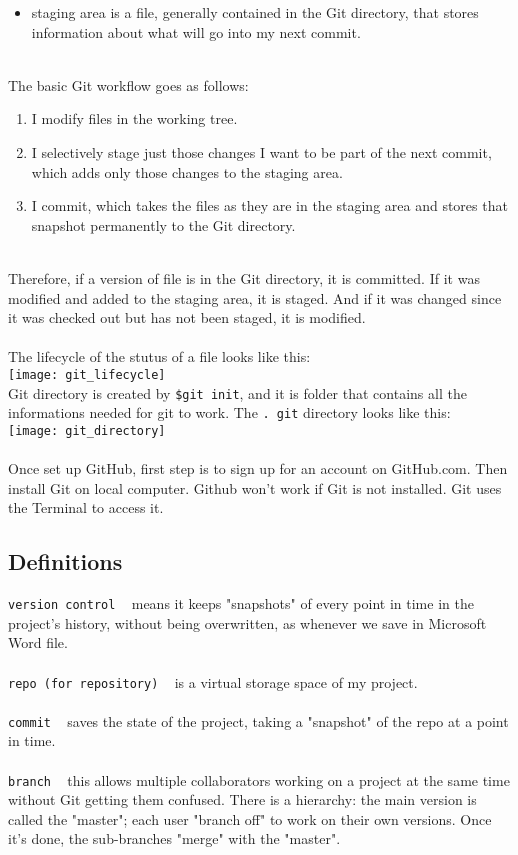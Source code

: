 \documentclass{article}
\begin{document}
{{{\begin{itemize}
  \item staging area is a file, generally contained in the Git directory, that stores information about what will go into my next commit. 
\end{itemize}
\\
The basic Git workflow goes as follows:
\begin{enumerate}
  \item I modify files in the working tree.
  \item I selectively stage just those changes I want to be part of the next commit, which adds only those changes to the staging area.
  \item I commit, which takes the files as they are in the staging area and stores that snapshot permanently to the Git directory. 
\end{enumerate}
\\
Therefore, if a version of file is in the Git directory, it is committed. If it was modified and added to the staging area, it is staged. And if it was changed since it was checked out but has not been staged, it is modified. \\
\\
The lifecycle of the stutus of a file looks like this:\\
\texttt{[image: git\_lifecycle]}\\
Git directory is created by \texttt{\$git init}, and it is folder that contains all the informations needed for git to work. The \texttt{. git} directory looks like this:\\
\texttt{[image: git\_directory]}\\
\\
Once
\To set up GitHub, first step is to sign up for an account on GitHub.com. Then install Git on local computer. Github won't work if Git is not installed. Git uses the Terminal to access it. \\ 
\subsection{Definitions}
\texttt{version control} ~ means it keeps "snapshots" of every point in time in the project's history, without being overwritten, as whenever we save in Microsoft Word file.\\
\\
\texttt{repo (for repository)} ~ is a virtual storage space of my project. \\
\\
\texttt{commit} ~  saves the state of the project, taking a "snapshot" of the repo at a point in time.\\
\\
\texttt{branch} ~ this allows multiple collaborators working on a project at the same time without Git getting them confused. There is a hierarchy: the main version is called the "master"; each user "branch off" to work on their own versions. Once it's done, the sub-branches "merge" with the "master". \\

}}}
\end{document}

